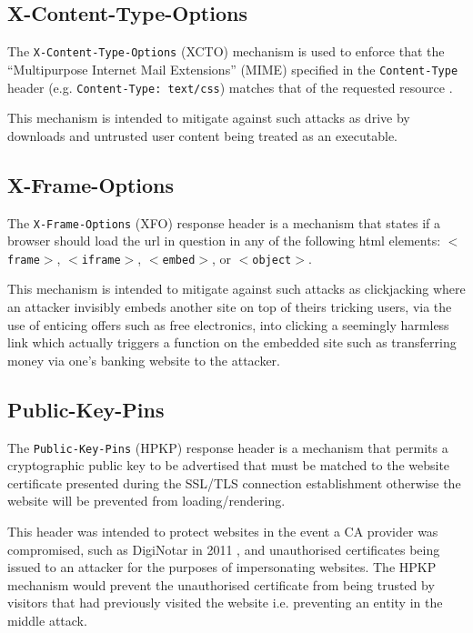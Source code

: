 \documentclass{mscreport}
\begin{document}
\subsection{X-Content-Type-Options}
The \texttt{X-Content-Type-Options} (XCTO) mechanism is used to enforce that the ``Multipurpose Internet Mail Extensions'' (MIME) specified in the \texttt{Content-Type} header (e.g. \newline 
\texttt{Content-Type: text/css}) matches that of the requested resource \cite{Apple_undated-hz}.

\vspace{0.3cm} \noindent
This mechanism is intended to mitigate against such attacks as drive by downloads and untrusted user content being treated as an executable.


\subsection{X-Frame-Options}
The \texttt{X-Frame-Options} (XFO) response header is a mechanism that states if a browser should load the url in question in any of the following html elements: \texttt{$<$frame$>$}, \texttt{$<$iframe$>$}, \texttt{$<$embed$>$}, or \texttt{$<$object$>$}.

\vspace{0.3cm} \noindent
This mechanism is intended to mitigate against such attacks as clickjacking where an attacker invisibly embeds another site on top of theirs tricking users, via the use of enticing offers such as free electronics, into clicking a seemingly harmless link which actually triggers a function on the embedded site such as transferring money via one's banking website to the attacker.


\subsection{Public-Key-Pins}
The \texttt{Public-Key-Pins} (HPKP) response header is a mechanism that permits a cryptographic public key to be advertised that must be matched to the website certificate presented during the SSL/TLS connection establishment otherwise the website will be prevented from loading/rendering.

\vspace{0.3cm} \noindent
This header was intended to protect websites in the event a CA provider was compromised, such as DigiNotar in 2011 \cite{Amann2017-co}, and unauthorised certificates being issued to an attacker for the purposes of impersonating websites. The HPKP mechanism would prevent the unauthorised certificate from being trusted by visitors that had previously visited the website i.e. preventing an entity in the middle attack.
\end{document}
